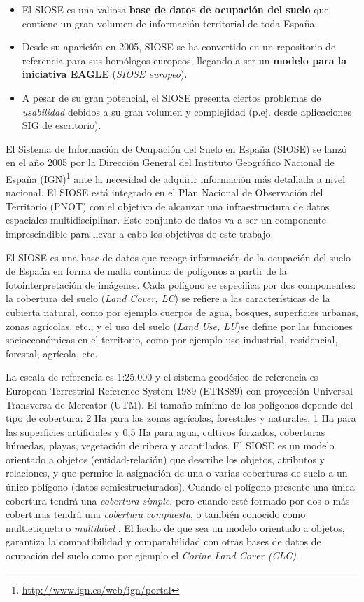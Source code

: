 \begin{graybox}
\begin{itemize}
\item El SIOSE es una valiosa \textbf{base de datos de ocupación del suelo} que contiene un gran volumen de información territorial de toda España.
\item Desde su aparición en 2005, SIOSE se ha convertido en un repositorio de referencia para sus homólogos europeos, llegando a ser un \textbf{modelo para la iniciativa EAGLE} (\textit{SIOSE europeo}). 
\item A pesar de su gran potencial, el SIOSE presenta ciertos problemas de \textit{usabilidad} debidos a su gran volumen y complejidad (p.ej. desde aplicaciones SIG de escritorio).
\end{itemize}
\end{graybox}


El Sistema de Información de Ocupación del Suelo en España (SIOSE) se lanzó en el año 2005 por la Dirección General del Instituto Geográfico Nacional de España (IGN)\footnote{\url{http://www.ign.es/web/ign/portal}} ante la necesidad de adquirir información más detallada a nivel nacional. El SIOSE está integrado en el Plan Nacional de Observación del Territorio (PNOT) con el objetivo de alcanzar una infraestructura de datos espaciales multidisciplinar. Este conjunto de datos va a ser un componente imprescindible para llevar a cabo los objetivos de este trabajo.

El SIOSE es una base de datos que recoge información de la ocupación del suelo de España en forma de malla continua de polígonos a partir de la fotointerpretación de imágenes. Cada polígono se especifica por dos componentes: la cobertura del suelo (\textit{Land Cover, LC}) se refiere a las características de la cubierta natural, como por ejemplo cuerpos de agua, bosques, superficies urbanas, zonas agrícolas, etc., y el uso del suelo (\textit{Land Use, LU})se define por las funciones socioeconómicas en el territorio, como por ejemplo uso industrial, residencial, forestal, agrícola, etc.

La escala de referencia es 1:25.000 y el sistema geodésico de referencia es European Terrestrial Reference System 1989 (ETRS89) con proyección Universal Transversa de Mercator (UTM). El tamaño mínimo de los polígonos depende del tipo de cobertura: 2 Ha para las zonas agrícolas, forestales y naturales, 1 Ha para las superficies artificiales y 0,5 Ha para agua, cultivos forzados, coberturas húmedas, playas, vegetación de ribera y acantilados. El SIOSE es un modelo orientado a objetos (entidad-relación) que describe los objetos, atributos y relaciones, y que permite la asignación de una o varias coberturas de suelo a un único polígono (datos semiestructurados). Cuando el polígono presente una única cobertura tendrá una \textit{cobertura simple}, pero cuando esté formado por dos o más coberturas tendrá una \textit{cobertura compuesta}, o también conocido como multietiqueta o \textit{multilabel} \citep{EquipoTecnicoNacionalSIOSE2015}. El hecho de que sea un modelo orientado a objetos, garantiza la compatibilidad y comparabilidad con otras bases de datos de ocupación del suelo como por ejemplo el \textit{Corine Land Cover (CLC)}.

